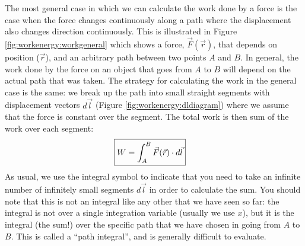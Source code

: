 The most general case in which we can calculate the work done by a force is the case when the force changes continuously along a path where the displacement also changes direction continuously. This is illustrated in Figure \ref{fig:workenergy:workgeneral} which shows a force, $\vec F(\vec r)$, that depends on position ($\vec r$), and an arbitrary path between two points $A$ and $B$. In general, the work done by the force on an object that goes from $A$ to $B$ will depend on the actual path that was taken.
The strategy for calculating the work in the general case is the same: we break up the path into small straight segments with displacement vectors $d\vec l$ (Figure \ref{fig:workenergy:dldiagram}) where we assume that the force is constant over the segment. The total work is then sum of the work over each segment:
\begin{align}
\Aboxed{W = \int_A^B \vec F(\vec r) \cdot d\vec l}
\end{align}
As usual, we use the integral symbol to indicate that you need to take an infinite number of infinitely small segments $d\vec l$ in order to calculate the sum.
You should note that this is not an integral like any other that we have seen so far: the integral is not over a single integration variable (usually we use $x$), but it is the integral (the sum!) over the specific path that we have chosen in going from $A$ to $B$. This is called a ``path integral'', and is generally difficult to evaluate. 


